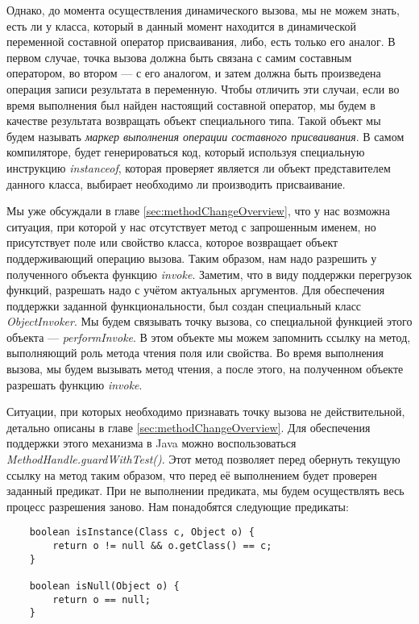 Однако, до момента осуществления динамического вызова, мы не можем знать, есть ли у класса, который в данный момент находится в динамической переменной составной оператор присваивания, либо, есть только его аналог. В первом случае, точка вызова должна быть связана с самим составным оператором, во втором --- с его аналогом, и затем должна быть произведена операция записи результата в переменную. Чтобы отличить эти случаи, если во время выполнения был найден настоящий составной оператор, мы будем в качестве результата возвращать объект специального типа. Такой объект мы будем называть \textit{маркер выполнения операции составного присваивания}. В самом компиляторе, будет генерироваться код, который используя специальную инструкцию \textit{instanceof}, которая проверяет является ли объект представителем данного класса, выбирает необходимо ли производить присваивание.

Мы уже обсуждали в главе \ref{sec:methodChangeOverview}, что у нас возможна ситуация, при которой у нас отсутствует метод с запрошенным именем, но присутствует поле или свойство класса, которое возвращает объект поддерживающий операцию вызова.
Таким образом, нам надо разрешить у полученного объекта функцию \textit{invoke}. Заметим, что в виду поддержки перегрузок функций, разрешать надо с учётом актуальных аргументов. Для обеспечения поддержки заданной функциональности, был создан специальный класс \textit{ObjectInvoker}. Мы будем связывать точку вызова, со специальной функцией этого объекта --- \textit{performInvoke}. В этом объекте мы можем запомнить ссылку на метод, выполняющий роль метода чтения поля или свойства. Во время выполнения вызова, мы будем вызывать метод чтения, а после этого, на полученном объекте разрешать функцию \textit{invoke}.


Ситуации, при которых необходимо признавать точку вызова не действительной, детально описаны в главе \ref{sec:methodChangeOverview}. Для обеспечения поддержки этого механизма в Java можно воспользоваться \textit{MethodHandle.guardWithTest()}. Этот метод позволяет перед обернуть текущую ссылку на метод таким образом, что перед её выполнением будет проверен заданный предикат. При не выполнении предиката, мы будем осуществлять весь процесс разрешения заново. Нам понадобятся следующие предикаты:

\begin{verbatim}
    boolean isInstance(Class c, Object o) {
        return o != null && o.getClass() == c;
    }

    boolean isNull(Object o) {
        return o == null;
    }
\end{verbatim} 

